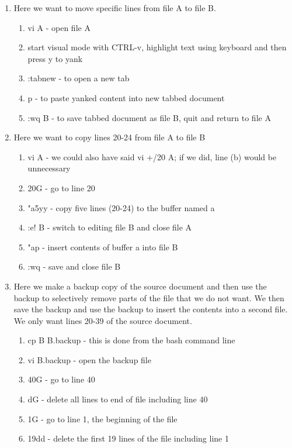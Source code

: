 \begin{enumerate}
	\item {} Here we want to move specific lines from file A to file B.
	\begin{enumerate}
		\item vi A - open file A
		\item start visual mode with CTRL-v, highlight text using keyboard and then press y to yank
		\item :tabnew - to open a new tab 
		\item p - to paste yanked content into new tabbed document
		\item :wq B - to save tabbed document as file B, quit and return to file A
	\end{enumerate}
	\item {} Here we want to copy lines 20-24 from file A to file B
	\begin{enumerate}
		\item vi A - we could also have said vi +/20 A; if we did, line (b) would be unnecessary
		\item 20G - go to line 20
		\item "a5yy - copy five lines (20-24) to the buffer named a
		\item :e! B - switch to editing file B and close file A
		\item "ap - insert contents of buffer a into file B
		\item :wq - save and close file B
	\end{enumerate}
	\item {} Here we make a backup copy of the source document and then use the backup to selectively remove parts of the file that we do not want. We then save the backup and use the backup to insert the contents into a second file. We only want lines 20-39 of the source document. 
	\begin{enumerate}
		\item cp B B.backup - this is done from the bash command line
		\item vi B.backup - open the backup file
		\item 40G - go to line 40
		\item dG - delete all lines to end of file including line 40
		\item 1G - go to line 1, the beginning of the file
		\item 19dd - delete the first 19 lines of the file including line 1

\end{enumerate}
\end{enumerate}

